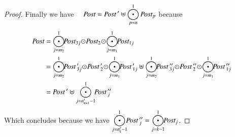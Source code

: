 \documentclass{elsarticle}
\newcommand{\shortodot}{\!\odot\!}
\begin{document}
\begin{proof}
Finally we have~~
$\Post=\displaystyle{\Post\,' \uplus \bigodot_{p=n}^1
		\Post_p}$\quad
because
{\small \begin{align*}
\Post&=\bigodot_{j=m_2}^{1}\!\!\Post_{3j}\shortodot\Post_2\shortodot\bigodot_{j=m_1}^{1}\!\!\Post_{1j}\\
&=\bigodot_{j=m_2}^{1}\!\!\Post\,'_{3j}\shortodot\Post\,'_2\shortodot\bigodot_{j=m_1}^{1}\!\!\Post\,'_{1j} \uplus \bigodot_{j=m_2}^{1}\!\!\Post\,''_{3j}\shortodot\Post\,''_2\shortodot\bigodot_{j=m_1}^{1}\!\!\Post\,''_{1j}\\
&=\Post\,' \uplus \bigodot_{j=n'_{n+1}-1}^{1}\!\!\Post\,''_{j}
\end{align*}}
Which concludes because  we have $\displaystyle{\bigodot_{j=n'_{k}-1}^{1}\!\!\Post\,''_{j} = \bigodot_{j=k-1}^{1}\!\!\Post_{j}}$.
%
%

\end{proof}
\end{document}
